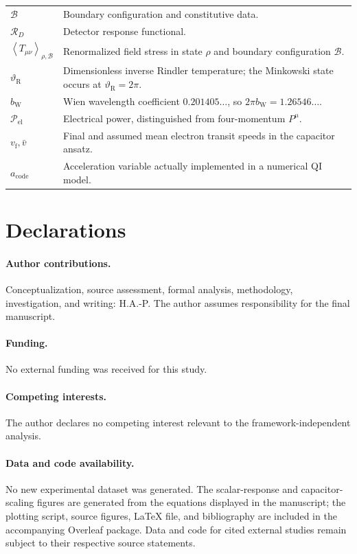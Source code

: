 \documentclass[11pt]{article}
\newcommand{\avg}[1]{\left\langle #1\right\rangle}
\newcommand{\Bdy}{\mathcal{B}}
\begin{document}
\begin{tabularx}{\textwidth}{>{\raggedright\arraybackslash}p{}X}
\(\Bdy\) & Boundary configuration and constitutive data. \\
\(\mathcal R_D\) & Detector response functional. \\
\(\avg{T_{\mu\nu}}_{\rho,\Bdy}\) & Renormalized field stress in state \(\rho\) and boundary configuration \(\Bdy\). \\
\(\vartheta_{\mathrm R}\) & Dimensionless inverse Rindler temperature; the Minkowski state occurs at \(\vartheta_{\mathrm R}=2\pi\). \\
\(b_{\mathrm W}\) & Wien wavelength coefficient \(0.201405\ldots\), so \(2\pi b_{\mathrm W}=1.26546\ldots\). \\
\(\mathcal P_{\mathrm{el}}\) & Electrical power, distinguished from four-momentum \(P^{\mu}\). \\
\(v_{\mathrm f},\bar v\) & Final and assumed mean electron transit speeds in the capacitor ansatz. \\
\(a_{\mathrm{code}}\) & Acceleration variable actually implemented in a numerical QI model. \\

\bottomrule
\end{tabularx}

\section*{Declarations}
\paragraph{Author contributions.}
Conceptualization, source assessment, formal analysis, methodology, investigation, and writing: H.A.-P. The author assumes responsibility for the final manuscript.

\paragraph{Funding.}
No external funding was received for this study.

\paragraph{Competing interests.}
The author declares no competing interest relevant to the framework-independent analysis.

\paragraph{Data and code availability.}
No new experimental dataset was generated. The scalar-response and capacitor-scaling figures are generated from the equations displayed in the manuscript; the plotting script, source figures, LaTeX file, and bibliography are included in the accompanying Overleaf package. Data and code for cited external studies remain subject to their respective source statements.
\end{document}
